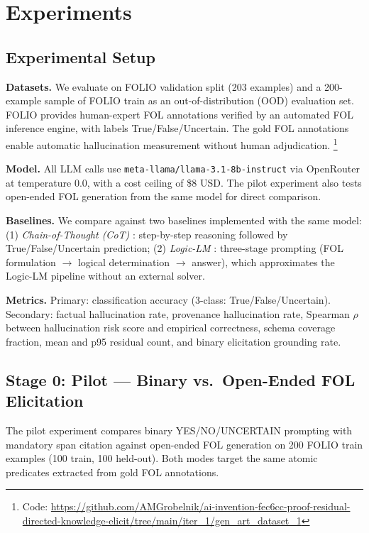 \documentclass[11pt,letterpaper]{article}
\begin{document}
\section{Experiments}
\label{sec:experiments}

\subsection{Experimental Setup}

\noindent\textbf{Datasets.}
We evaluate on FOLIO \citep{Han2022} validation split (203 examples) and a 200-example sample of FOLIO train as an out-of-distribution (OOD) evaluation set. FOLIO provides human-expert FOL annotations verified by an automated FOL inference engine, with labels True/False/Uncertain. The gold FOL annotations enable automatic hallucination measurement without human adjudication.%
\footnote{Code: \url{https://github.com/AMGrobelnik/ai-invention-fec6cc-proof-residual-directed-knowledge-elicit/tree/main/iter_1/gen_art_dataset_1}}

\noindent\textbf{Model.}
All LLM calls use \texttt{meta-llama/llama-3.1-8b-instruct} via OpenRouter at temperature 0.0, with a cost ceiling of \$8 USD. The pilot experiment also tests open-ended FOL generation from the same model for direct comparison.

\noindent\textbf{Baselines.}
We compare against two baselines implemented with the same model: (1) \emph{Chain-of-Thought (CoT)} \citep{Wei2022}: step-by-step reasoning followed by True/False/Uncertain prediction; (2) \emph{Logic-LM} \citep{Pan2023}: three-stage prompting (FOL formulation $\rightarrow$ logical determination $\rightarrow$ answer), which approximates the Logic-LM pipeline without an external solver.

\noindent\textbf{Metrics.}
Primary: classification accuracy (3-class: True/False/Uncertain). Secondary: factual hallucination rate, provenance hallucination rate, Spearman $\rho$ between hallucination risk score and empirical correctness, schema coverage fraction, mean and p95 residual count, and binary elicitation grounding rate.

\subsection{Stage 0: Pilot --- Binary vs.\ Open-Ended FOL Elicitation}

The pilot experiment compares binary YES/NO/UNCERTAIN prompting with mandatory span citation against open-ended FOL generation on 200 FOLIO train examples (100 train, 100 held-out). Both modes target the same atomic predicates extracted from gold FOL annotations.
\end{document}
